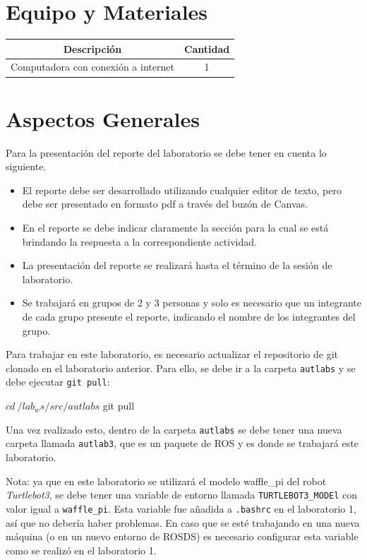 \documentclass[a4paper,11pt]{robotlabs}
\begin{document}
\section{Equipo y Materiales}

\begin{table}[h]
  \centering
  \begin{tabular}{cc}
    \toprule
    \textbf{Descripción} & \textbf{Cantidad} \\
    \midrule
    Computadora con conexi\'on a internet & 1 \\
    \bottomrule
    \end{tabular}
  \end{table}

\section{Aspectos Generales}

Para la presentación del reporte  del laboratorio se debe tener en cuenta lo
siguiente.
\begin{itemize}
\item El reporte debe ser desarrollado utilizando cualquier editor de texto,
  pero debe ser presentado en formato pdf a través del buzón de
  Canvas.
\item En el reporte se debe indicar claramente la sección para la cual se está
  brindando la respuesta a la correspondiente actividad.
\item La presentación del reporte se realizará hasta el término de la sesión de
  laboratorio.
\item Se trabajará en grupos de 2 y 3 personas y solo es necesario que un
  integrante de cada grupo presente el reporte, indicando el nombre de los
  integrantes del grupo.
\end{itemize}
Para trabajar en este laboratorio, es necesario actualizar el repositorio de
git clonado en el laboratorio anterior. Para ello, se debe ir a la carpeta
\texttt{autlabs} y se debe ejecutar \texttt{git pull}:
\begin{listingshell}
$ cd ~/lab_ws/src/autlabs
$ git pull
\end{listingshell}
\noindent Una vez realizado esto, dentro de la carpeta \texttt{autlabs} se debe
tener una nueva carpeta llamada \texttt{autlab3}, que es un paquete de ROS y es
donde se trabajará este laboratorio.

Nota: ya que en este laboratorio se utilizará el modelo waffle\_pi del robot
\textit{Turtlebot3}, se debe tener una variable de entorno llamada
\texttt{TURTLEBOT3\_MODEl} con valor igual a \texttt{waffle\_pi}. Esta variable
fue añadida a \texttt{.bashrc} en el laboratorio 1, así que no debería haber
problemas. En caso que se esté trabajando en una nueva máquina (o en un nuevo
entorno de ROSDS) es necesario configurar esta variable como se realizó en el
laboratorio 1. 
\end{document}
